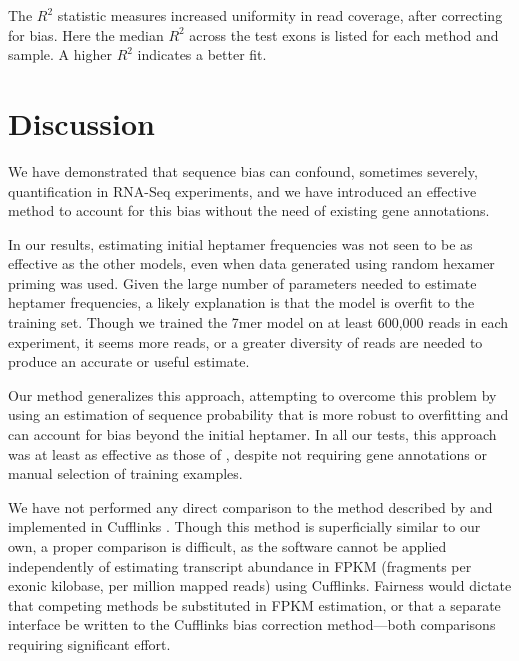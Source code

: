 \documentclass{bioinfo}
\begin{document}
\begin{table}
{
    The $R^2$ statistic measures increased uniformity in read coverage, after
    correcting for bias.  Here the median $R^2$ across the test exons is listed
    for each method and sample. A higher $R^2$ indicates a better fit.
}
\end{table}



\section{Discussion}

We have demonstrated that sequence bias can confound, sometimes severely,
quantification in RNA-Seq experiments, and we have introduced an effective
method to account for this bias without the need of existing gene annotations.

In our results, estimating initial heptamer frequencies was not seen to be as
effective as the other models, even when data generated using random hexamer
priming was used. Given the large number of parameters needed to estimate
heptamer frequencies, a likely explanation is that the model is overfit to the
training set. Though we trained the 7mer model on at least 600,000 reads in each
experiment, it seems more reads, or a greater diversity of reads are needed
to produce an accurate or useful estimate.

Our method generalizes this approach, attempting to overcome this problem by
using an estimation of sequence probability that is more robust to overfitting
and can account for bias beyond the initial heptamer. In all our tests, this
approach was at least as effective as those of \citet{Li2010}, despite not
requiring gene annotations or manual selection of training examples.

We have not performed any direct comparison to the method described by
\citet{Roberts2011} and implemented in Cufflinks \citep{Trapnell2010}. Though
this method is superficially similar to our own, a proper comparison is
difficult, as the software cannot be applied independently of estimating
transcript abundance in FPKM (fragments per exonic kilobase, per million mapped
reads) using Cufflinks. Fairness would dictate that competing methods be
substituted in FPKM estimation, or that a separate interface be written to the
Cufflinks bias correction method---both comparisons requiring significant effort.
\end{document}
